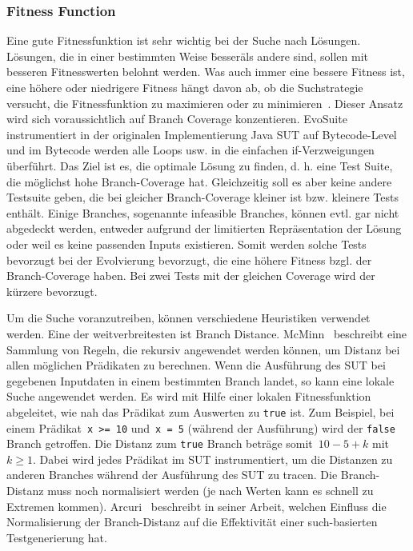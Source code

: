 \documentclass{article}
\begin{document}
\subsubsection{Fitness Function}
Eine gute Fitnessfunktion ist sehr wichtig bei der Suche nach Lösungen. Lösungen, die in einer bestimmten Weise \"besser\" als andere sind, sollen mit besseren Fitnesswerten belohnt werden. Was auch immer eine bessere Fitness ist, eine höhere oder niedrigere Fitness hängt davon ab, ob die Suchstrategie versucht, die Fitnessfunktion zu maximieren oder zu minimieren~\cite{McMinn_2004}. Dieser Ansatz wird sich voraussichtlich auf Branch Coverage konzentieren. EvoSuite instrumentiert in der originalen Implementierung Java SUT auf Bytecode-Level und im Bytecode werden alle Loops usw. in die einfachen if-Verzweigungen überführt. Das Ziel ist es, die optimale Lösung zu finden, d. h. eine Test Suite, die möglichst hohe Branch-Coverage hat. Gleichzeitig soll es aber keine andere Testsuite geben, die bei gleicher Branch-Coverage kleiner ist bzw. kleinere Tests enthält. Einige Branches, sogenannte infeasible Branches, können evtl. gar nicht abgedeckt werden, entweder aufgrund der limitierten Repräsentation der Lösung oder weil es keine passenden Inputs existieren. Somit werden solche Tests bevorzugt bei der Evolvierung bevorzugt, die eine höhere Fitness bzgl. der Branch-Coverage haben. Bei zwei Tests mit der gleichen Coverage wird der kürzere bevorzugt. 

Um die Suche voranzutreiben, können verschiedene Heuristiken verwendet werden.  Eine der weitverbreitesten ist Branch Distance. McMinn~\cite{McMinn_2004} beschreibt eine Sammlung von Regeln, die rekursiv angewendet werden können, um Distanz bei allen möglichen Prädikaten zu berechnen. Wenn die Ausführung des \ac{SUT} bei gegebenen Inputdaten in einem bestimmten Branch landet, so kann eine lokale Suche angewendet werden. Es wird mit Hilfe einer lokalen Fitnessfunktion abgeleitet, wie nah das Prädikat zum Auswerten zu \lstinline{true} ist. Zum Beispiel, bei einem Prädikat~\lstinline{x >= 10} und~\lstinline{x = 5} (während der Ausführung) wird der \lstinline{false} Branch getroffen. Die Distanz zum \lstinline{true} Branch beträge somit~$10 - 5 + k$ mit~$k \geq 1$. Dabei wird jedes Prädikat im \ac{SUT} instrumentiert, um die Distanzen zu anderen Branches während der Ausführung des \ac{SUT} zu tracen. Die Branch-Distanz muss noch normalisiert werden (je nach Werten kann es schnell zu Extremen kommen). Arcuri~\cite{Arcuri_2011} beschreibt in seiner Arbeit, welchen Einfluss die Normalisierung der Branch-Distanz auf die Effektivität einer such-basierten Testgenerierung hat. 
\end{document}
